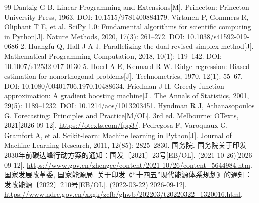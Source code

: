 \begingroup
\small
{}
\begin{thebibliography}{99}
\setlength{\itemsep}{2pt}
\setlength{\parskip}{0pt}
 Dantzig G B. Linear Programming and Extensions[M]. Princeton: Princeton University Press, 1963. DOI: 10.1515/9781400884179.
 Virtanen P, Gommers R, Oliphant T E, et al. SciPy 1.0: Fundamental algorithms for scientific computing in Python[J]. Nature Methods, 2020, 17(3): 261--272. DOI: 10.1038/s41592-019-0686-2.
 Huangfu Q, Hall J A J. Parallelizing the dual revised simplex method[J]. Mathematical Programming Computation, 2018, 10(1): 119--142. DOI: 10.1007/s12532-017-0130-5.
 Hoerl A E, Kennard R W. Ridge regression: Biased estimation for nonorthogonal problems[J]. Technometrics, 1970, 12(1): 55--67. DOI: 10.1080/00401706.1970.10488634.
 Friedman J H. Greedy function approximation: A gradient boosting machine[J]. The Annals of Statistics, 2001, 29(5): 1189--1232. DOI: 10.1214/aos/1013203451.
 Hyndman R J, Athanasopoulos G. Forecasting: Principles and Practice[M/OL]. 3rd ed. Melbourne: OTexts, 2021[2026-09-12]. \url{https://otexts.com/fpp3/}.
 Pedregosa F, Varoquaux G, Gramfort A, et al. Scikit-learn: Machine learning in Python[J]. Journal of Machine Learning Research, 2011, 12(85): 2825--2830.
 国务院. 国务院关于印发2030年前碳达峰行动方案的通知：国发〔2021〕23号[EB/OL]. (2021-10-26)[2026-09-12]. \url{https://www.gov.cn/zhengce/content/2021-10/26/content_5644984.htm}.
 国家发展改革委, 国家能源局. 关于印发《“十四五”现代能源体系规划》的通知：发改能源〔2022〕210号[EB/OL]. (2022-03-22)[2026-09-12]. \url{https://www.ndrc.gov.cn/xxgk/zcfb/ghwb/202203/t20220322_1320016.html}.
\end{thebibliography}
\endgroup
